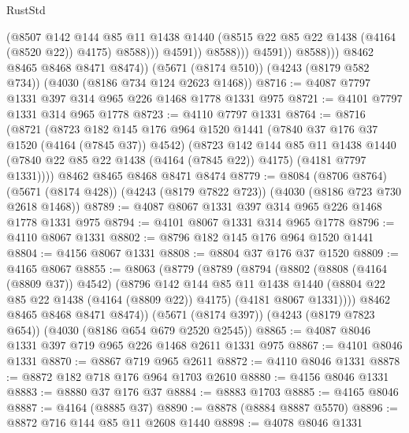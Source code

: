 \begin{lexlean}{RustStd}
\begin{coremodule}
                                (@8507
                                  @142
                                  @144
                                  @85
                                  @11
                                  @1438
                                  @1440
                                  (@8515 @22 @85 @22 @1438 (@4164 (@8520 @22)) @4175)
                                  @8588)))
                            @4591))
                        @8588)))
                  @4591))
              @8588)))
        @8462
        @8465
        @8468
        @8471
        @8474))
    (@5671 (@8174 @510))
    (@4243 (@8179 @582 @734))
    (@4030 (@8186 @734 @124 @2623 @1468))
@8716 := @4087 @7797 @1331 @397 @314 @965 @226 @1468 @1778 @1331 @975
@8721 := @4101 @7797 @1331 @314 @965 @1778
@8723 := @4110 @7797 @1331
@8764 := @8716
    (@8721
      (@8723
        @182
        @145
        @176
        @964
        @1520
        @1441
        (@7840 @37 @176 @37 @1520 (@4164 (@7845 @37)) @4542)
        (@8723
          @142
          @144
          @85
          @11
          @1438
          @1440
          (@7840 @22 @85 @22 @1438 (@4164 (@7845 @22)) @4175)
          (@4181 @7797 @1331))))
    @8462
    @8465
    @8468
    @8471
    @8474
@8779 := @8084
    (@8706 @8764)
    (@5671 (@8174 @428))
    (@4243 (@8179 @7822 @723))
    (@4030 (@8186 @723 @730 @2618 @1468))
@8789 := @4087 @8067 @1331 @397 @314 @965 @226 @1468 @1778 @1331 @975
@8794 := @4101 @8067 @1331 @314 @965 @1778
@8796 := @4110 @8067 @1331
@8802 := @8796 @182 @145 @176 @964 @1520 @1441
@8804 := @4156 @8067 @1331
@8808 := @8804 @37 @176 @37 @1520
@8809 := @4165 @8067
@8855 := @8063
    (@8779
      (@8789
        (@8794
          (@8802
            (@8808 (@4164 (@8809 @37)) @4542)
            (@8796
              @142
              @144
              @85
              @11
              @1438
              @1440
              (@8804 @22 @85 @22 @1438 (@4164 (@8809 @22)) @4175)
              (@4181 @8067 @1331))))
        @8462
        @8465
        @8468
        @8471
        @8474))
    (@5671 (@8174 @397))
    (@4243 (@8179 @7823 @654))
    (@4030 (@8186 @654 @679 @2520 @2545))
@8865 := @4087 @8046 @1331 @397 @719 @965 @226 @1468 @2611 @1331 @975
@8867 := @4101 @8046 @1331
@8870 := @8867 @719 @965 @2611
@8872 := @4110 @8046 @1331
@8878 := @8872 @182 @718 @176 @964 @1703 @2610
@8880 := @4156 @8046 @1331
@8883 := @8880 @37 @176 @37
@8884 := @8883 @1703
@8885 := @4165 @8046
@8887 := @4164 (@8885 @37)
@8890 := @8878 (@8884 @8887 @5570)
@8896 := @8872 @716 @144 @85 @11 @2608 @1440
@8898 := @4078 @8046 @1331

\end{coremodule}
\end{lexlean}
